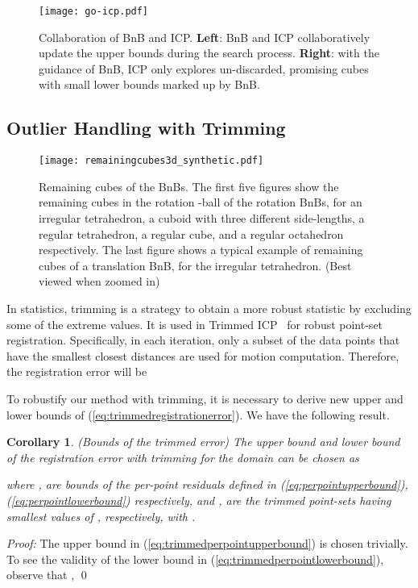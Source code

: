 \documentclass[10pt,journal,cspaper,compsoc]{IEEEtran}
\newtheorem{corollary}[theorem]{Corollary}
\begin{document}
\begin{figure}
\begin{center}
\texttt{[image: go-icp.pdf]}
\caption{Collaboration of BnB and ICP. \textbf{Left}: BnB and ICP collaboratively update the upper bounds during the search process.  \textbf{Right}: with the guidance of BnB, ICP only explores un-discarded, promising cubes with small lower bounds marked up by BnB. \label{fig:ICP_BnB_coop}}
\end{center}
\vspace{-5pt}
\end{figure}

\subsection{Outlier Handling with Trimming}\label{sec:outlier}
\begin{figure*}[!t]
\begin{center}
\texttt{[image: remainingcubes3d\_synthetic.pdf]}
\caption{Remaining cubes of the BnBs. The first five figures show the remaining cubes in the rotation -ball of the rotation BnBs, for an irregular tetrahedron, a cuboid with three different side-lengths, a regular tetrahedron, a regular cube, and a regular octahedron respectively. The last figure shows a typical example of remaining cubes of a translation BnB, for the irregular tetrahedron. (Best viewed when zoomed in)
\label{fig:rotationcubes}}
\end{center}
\end{figure*}

In statistics, trimming is a strategy to obtain a more robust statistic by excluding some of the extreme values. It is used in Trimmed ICP~\cite{chetverikov2005robust} for robust point-set registration. Specifically, in each iteration, only a subset  of the data points that have the smallest closest distances are used for motion computation. Therefore, the registration error will be

To robustify our method with trimming, it is necessary to derive new upper and lower bounds of (\ref{eq:trimmedregistrationerror}). We have the following result.
\begin{corollary}
    (Bounds of the trimmed  error) The upper bound  and lower bound  of the registration error with trimming for the domain   can be chosen as
    
    where ,  are bounds of the per-point residuals defined in (\ref{eq:perpointupperbound}), (\ref{eq:perpointlowerbound}) respectively, and ,  are the trimmed point-sets having smallest values of ,  respectively, with .
\end{corollary}
\noindent\emph{Proof:}
The upper bound in (\ref{eq:trimmedperpointupperbound}) is chosen trivially.
To see the validity of the lower bound in (\ref{eq:trimmedperpointlowerbound}), observe that ,
\qed
\end{document}
